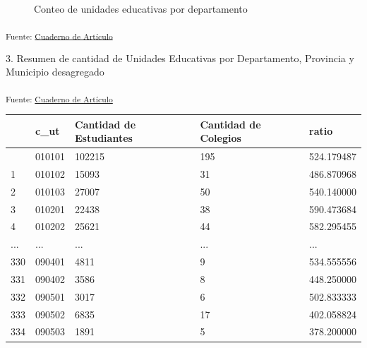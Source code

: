 \documentclass[
  12pt]{article}
\begin{document}
\begin{figure}[H]


\caption{\label{fig-rept2024}Conteo de unidades educativas por
departamento}

\end{figure}%

\textsubscript{Fuente: \href{sociest.org/index.ipynb.html}{Cuaderno de
Artículo}}

3. Resumen de cantidad de Unidades Educativas por Departamento,
Provincia y Municipio desagregado

\textsubscript{Fuente: \href{sociest.org/index.ipynb.html}{Cuaderno de
Artículo}}

\begin{longtable}[]{@{}lllll@{}}
\toprule\noalign{}
& c\_ut & Cantidad de Estudiantes & Cantidad de Colegios & ratio \\
\midrule\noalign{}
\endhead
\bottomrule\noalign{}
\endlastfoot
0 & 010101 & 102215 & 195 & 524.179487 \\
1 & 010102 & 15093 & 31 & 486.870968 \\
2 & 010103 & 27007 & 50 & 540.140000 \\
3 & 010201 & 22438 & 38 & 590.473684 \\
4 & 010202 & 25621 & 44 & 582.295455 \\
... & ... & ... & ... & ... \\
330 & 090401 & 4811 & 9 & 534.555556 \\
331 & 090402 & 3586 & 8 & 448.250000 \\
332 & 090501 & 3017 & 6 & 502.833333 \\
333 & 090502 & 6835 & 17 & 402.058824 \\
334 & 090503 & 1891 & 5 & 378.200000 \\
\end{longtable}
\end{document}
